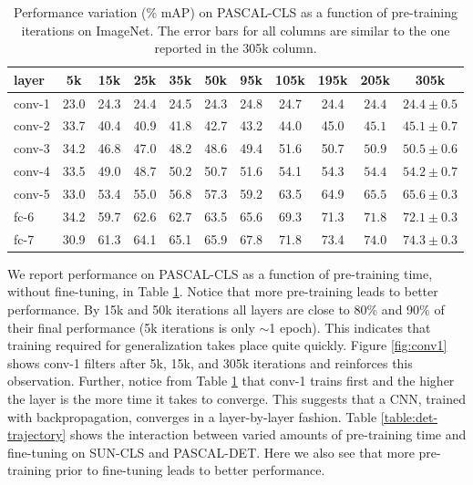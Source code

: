 \setlength{\tabcolsep}{4pt}
\begin{table}[t!]
\begin{center}
\caption{Performance variation (\% mAP) on PASCAL-CLS as a function of pre-training iterations on ImageNet. The error bars  for all columns are similar to the one reported in the 305k column.}
\label{table:det-traj-classify}
\vspace{0.3em}
\begin{tabular}{lcccccccccc}
layer  & 5k & 15k & 25k & 35k & 50k & 95k & 105k & 195k & 205k & 305k \\
\hline
conv-1 & 23.0 & 24.3 & 24.4 & 24.5 & 24.3 & 24.8 & 24.7 & 24.4 & $24.4$  & $24.4 \pm 0.5$ \\
conv-2 & 33.7 & 40.4 & 40.9 & 41.8 & 42.7 & 43.2 & 44.0 & 45.0 & $45.1$  & $45.1 \pm 0.7$ \\
conv-3 & 34.2 & 46.8 & 47.0 & 48.2 & 48.6 & 49.4 & 51.6 & 50.7 & $50.9$  & $50.5 \pm 0.6$ \\
conv-4 & 33.5 & 49.0 & 48.7 & 50.2 & 50.7 & 51.6 & 54.1 & 54.3 & $54.4$  & $54.2 \pm 0.7$ \\
conv-5 & 33.0 & 53.4 & 55.0 & 56.8 & 57.3 & 59.2 & 63.5 & 64.9 & $65.5$  & $65.6 \pm 0.3 $ \\
fc-6   & 34.2 & 59.7 & 62.6 & 62.7 & 63.5 & 65.6 & 69.3 & 71.3 & $71.8$  & $72.1 \pm 0.3 $\\
fc-7   & 30.9 & 61.3 & 64.1 & 65.1 & 65.9 & 67.8 & 71.8 & 73.4 & $74.0$  & $74.3 \pm 0.3 $\\
\end{tabular}
\end{center}
\end{table}
\setlength{\tabcolsep}{1.4pt}

We report performance on PASCAL-CLS as a function of pre-training time, without fine-tuning, in Table \ref{table:det-traj-classify}. Notice that more pre-training leads to better performance. By 15k and 50k iterations all layers are close to 80\% and  90\% of their final performance (5k iterations is only $\sim$1 epoch). This indicates that training required for generalization takes place quite quickly. Figure \ref{fig:conv1} shows conv-1 filters after 5k, 15k, and 305k iterations and reinforces this observation. Further, notice from Table \ref{table:det-traj-classify} that conv-1 trains first and the higher the layer is the more time it takes to converge. This suggests that a CNN, trained with backpropagation, converges in a layer-by-layer fashion.
Table \ref{table:det-trajectory} shows the interaction between varied amounts of pre-training time and fine-tuning on SUN-CLS and PASCAL-DET.
Here we also see that more pre-training prior to fine-tuning leads to better performance.

